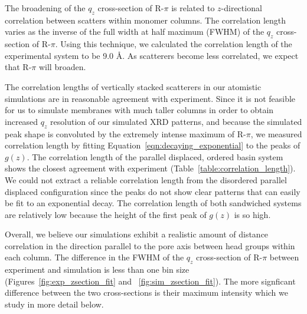 \documentclass[journal=jpcbfk,manuscript=article]{achemso}
\begin{document}
  The broadening of the $q_z$ cross-section of R-$\pi$ is related to
  $z$-directional correlation between scatters within monomer columns. The
  correlation length varies as the inverse of the full width at half maximum
  (FWHM) of the $q_z$ cross-section of R-$\pi$.  Using this technique, we
  calculated the correlation length of the experimental system to be 9.0 \AA. As
  scatterers become less correlated, we expect that R-$\pi$ will broaden.

  The correlation lengths of vertically stacked scatterers in our atomistic
  simulations are in reasonable agreement with experiment. Since it is not
  feasible for us to simulate membranes with much taller columns in order to
  obtain increased $q_z$ resolution of our simulated XRD patterns, and because
  the simulated peak shape is convoluted by the extremely intense maximum of
  R-$\pi$, we measured correlation length by fitting
  Equation~\ref{eqn:decaying_exponential} to the peaks of $g(z)$. The correlation
  length of the parallel displaced, ordered basin system shows the closest
  agreement with experiment (Table~\ref{table:correlation_length}). 
  We could not extract a reliable correlation length from the disordered
  parallel displaced configuration since the peaks do not show clear patterns
  that can easily be fit to an exponential decay. The correlation length of both
  sandwiched systems are relatively low because the height of the first peak of
  $g(z)$ is so high. 
  
  Overall, we believe our simulations exhibit a realistic amount of distance
  correlation in the direction parallel to the pore axis between head groups
  within each column. The difference in the FWHM of the $q_z$ cross-section of
  R-$\pi$ between experiment and simulation is less than one bin size
  (Figures~\ref{fig:exp_zsection_fit} and ~\ref{fig:sim_zsection_fit}). The more
  signficant difference between the two cross-sections is their maximum intensity
  which we study in more detail below.
  
\end{document}

